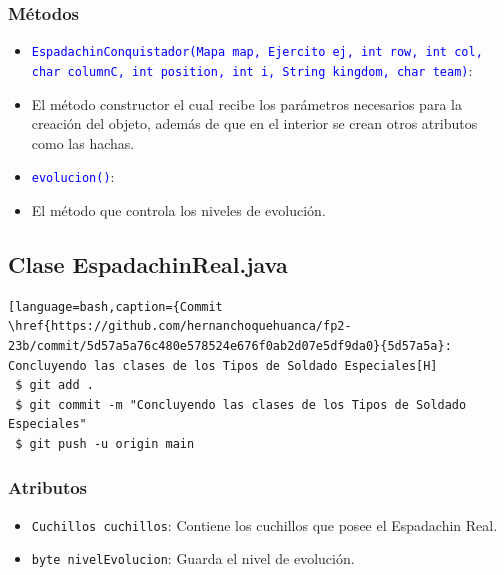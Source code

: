 \documentclass{article}
\begin{document}
\subsubsection{Métodos}
\begin{itemize}
    \item \texttt{\textcolor{blue}{EspadachinConquistador(Mapa map, Ejercito ej, int row, int col, char columnC, int position, int i, String kingdom, char team)}}:
    \item El método constructor el cual recibe los parámetros necesarios para la creación del objeto, además de que en el interior se crean otros atributos como las hachas.
\end{itemize}

\begin{itemize}
    \item \texttt{\textcolor{blue}{evolucion()}}: 
    \item El método que controla los niveles de evolución.
\end{itemize}



\subsection{Clase EspadachinReal.java}
\begin{lstlisting}[language=bash,caption={Commit \href{https://github.com/hernanchoquehuanca/fp2-23b/commit/5d57a5a76c480e578524e676f0ab2d07e5df9da0}{5d57a5a}: Concluyendo las clases de los Tipos de Soldado Especiales[H]
 $ git add .
 $ git commit -m "Concluyendo las clases de los Tipos de Soldado Especiales"			
 $ git push -u origin main
\end{lstlisting}

\subsubsection{Atributos}
\begin{itemize}
    \item \texttt{Cuchillos cuchillos}: Contiene los cuchillos que posee el Espadachin Real.
    \item \texttt{byte nivelEvolucion}: Guarda el nivel de evolución.
\end{itemize}

\end{document}
